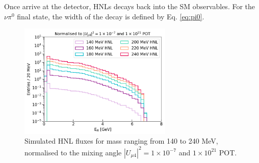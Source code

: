 Once arrive at the detector, HNLs decays back into the SM observables.
For the $\nu\pi^{0}$ final state, the width of the decay is defined by Eq. \ref{eq:pi0}.
\begin{figure}[tbp!] 
\centering    
\includegraphics[width=0.65\textwidth]{HNL_Energy_Spectrum}
\caption[HNL_Energy_Spectrum]{
Simulated HNL fluxes for mass ranging from 140 to 240 MeV, normalised to the mixing angle $|U_{\mu4}|^{2} = 1 \times 10^{-7}$ and $1 \times 10^{21}$ POT.
}
\label{fig:HNL_Energy_Spectrum}

\vspace{1cm}


\end{figure}
